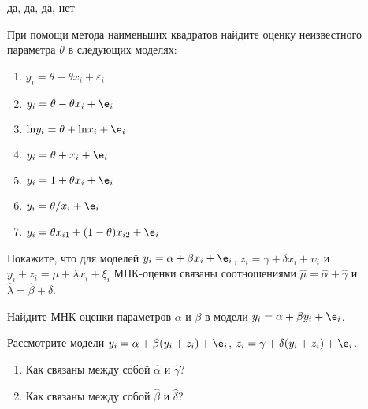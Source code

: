 \documentclass[pdftex,11pt,openany]{book}\usepackage[]{graphicx}\usepackage[]{color}
\begin{document}
\begin{solution}
 да, да, да, нет
\end{solution}




\begin{problem}
 При помощи метода наименьших квадратов найдите оценку неизвестного параметра $\theta$ в следующих моделях:

\begin{enumerate}
\item $y_i = \theta + \theta x_i + \varepsilon_i$
\item $y_i = \theta - \theta x_i + \e_i$
\item $\text{ln} y_i = \theta + \text{ln} x_i + \e_i$
\item $y_i = \theta + x_i + \e_i$
\item $y_i = 1 + \theta x_i + \e_i$
\item $y_i = \theta / x_i + \e_i$
\item $y_i = \theta x_{i1} + (1-\theta)x_{i2}+\e_i$
\end{enumerate}
\end{problem}

\begin{solution}
\end{solution}

\begin{problem}
 Покажите, что для моделей $y_i= \alpha + \beta x_i + \e_i$, $z_i = \gamma + \delta x_i + \upsilon_i$ и $y_i + z_i = \mu + \lambda x_i + \xi_i$ МНК-оценки связаны соотношениями $\hat{\mu}=\hat{\alpha}+\hat{\gamma}$ и $\hat{\lambda}=\hat{\beta} + \hat{\delta}$.
\end{problem}

\begin{solution}
\end{solution}

\begin{problem}
 Найдите МНК-оценки параметров $\alpha$ и $\beta$ в модели $y_i = \alpha + \beta y_i + \e_i$.
\end{problem}

\begin{solution}
\end{solution}

\begin{problem}
 Рассмотрите модели $y_i = \alpha + \beta (y_i + z_i) + \e_i$, $z_i = \gamma + \delta(y_i+z_i) + \e_i$. 
\begin{enumerate}
\item Как связаны между собой $\hat{\alpha}$ и $\hat{\gamma}$?
\item  Как связаны между собой $\hat{\beta}$ и $\hat{\delta}$?
\end{enumerate} 
\end{problem}
\end{document}
